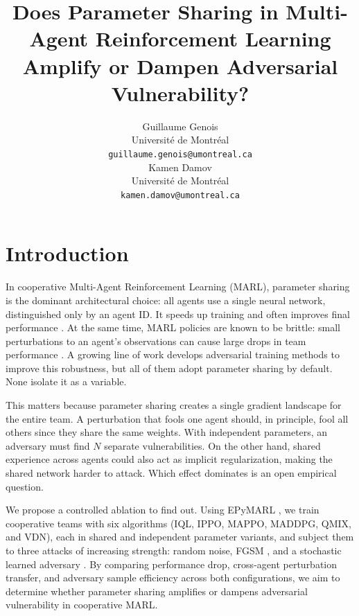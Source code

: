 \documentclass{article}
\title{Does Parameter Sharing in Multi-Agent Reinforcement Learning\\Amplify or Dampen Adversarial Vulnerability?}
\author{%
  Guillaume Genois \\
  Université de Montréal \\
  \texttt{guillaume.genois@umontreal.ca} \\
  \And
  Kamen Damov \\
  Université de Montréal \\
  \texttt{kamen.damov@umontreal.ca} \\
}
\begin{document}
\maketitle

\section{Introduction}
In cooperative Multi-Agent Reinforcement Learning (MARL), parameter sharing is the dominant architectural choice: all agents use a single neural network, distinguished only by an agent ID. It speeds up training and often improves final performance \citep{gupta2017cooperative}. At the same time, MARL policies are known to be brittle: small perturbations to an agent's observations can cause large drops in team performance \citep{zhang2021robust, zhou2025robust}. A growing line of work develops adversarial training methods to improve this robustness, but all of them adopt parameter sharing by default. None isolate it as a variable.

This matters because parameter sharing creates a single gradient landscape for the entire team. A perturbation that fools one agent should, in principle, fool all others since they share the same weights. With independent parameters, an adversary must find $N$ separate vulnerabilities. On the other hand, shared experience across agents could also act as implicit regularization, making the shared network harder to attack. Which effect dominates is an open empirical question.

We propose a controlled ablation to find out. Using EPyMARL \citep{christianos2020epymarl}, we train cooperative teams with six algorithms (IQL, IPPO, MAPPO, MADDPG, QMIX, and VDN), each in shared and independent parameter variants, and subject them to three attacks of increasing strength: random noise, FGSM \citep{goodfellow2014explaining}, and a stochastic learned adversary \citep{zhou2025robust}. By comparing performance drop, cross-agent perturbation transfer, and adversary sample efficiency across both configurations, we aim to determine whether parameter sharing amplifies or dampens adversarial vulnerability in cooperative MARL.

\end{document}
